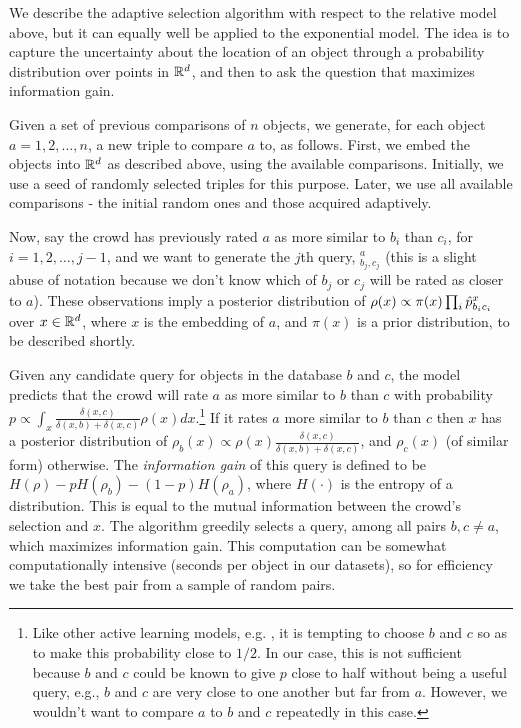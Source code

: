 \documentclass{article}
\begin{document}
We describe the adaptive selection algorithm with respect to the
relative model above, but it can equally well be applied to the
exponential model.  The idea is to capture the uncertainty about the
location of an object through a probability distribution over points
in $\mathbb{R}^d$, and then to ask the question that maximizes information
gain.

Given a set of previous comparisons of $n$ objects, we generate, for
each object $a=1,2,\ldots,n$, a new triple to compare $a$ to, as
follows.  First, we embed the objects into $\mathbb{R}^d$ as described
above, using the available comparisons. Initially, we use a seed of
randomly selected triples for this purpose. Later, we use all
available comparisons - the initial random ones and those acquired
adaptively.

Now, say the crowd has previously rated $a$ as more similar to $b_i$
than $c_i$, for $i=1,2,\ldots,j-1$, and we want to generate the $j$th
query, $^a_{b_j,c_j}$ (this is a slight abuse of notation because we
don't know which of $b_j$ or $c_j$ will be rated as closer to
$a$). These observations imply a posterior distribution of $\rho(x)
\propto \pi(x) \prod_i \hat{p}^{x}_{b_ic_i}$ over $x \in \mathbb{R}^d$, where
$x$ is the embedding of $a$, and $\pi(x)$ is a prior distribution, to
be described shortly.

Given any candidate query for objects in the database $b$ and $c$, the
model predicts that the crowd will rate $a$ as more similar to $b$
than $c$ with probability $p \propto \int_x
\frac{\delta(x,c)}{\delta(x,b)+\delta(x,c)}\rho(x)dx$.\footnote{Like
  other active learning models, e.g. \cite{??}, it is tempting to
  choose $b$ and $c$ so as to make this probability close to $1/2$.
  In our case, this is not sufficient because $b$ and $c$ could be
  known to give $p$ close to half without being a useful query, e.g.,
  $b$ and $c$ are very close to one another but far from $a$.
  However, we wouldn't want to compare $a$ to $b$ and $c$ repeatedly
  in this case.}  If it rates $a$ more similar to $b$ than $c$ then
$x$ has a posterior distribution of $\rho_b(x) \propto
\rho(x)\frac{\delta(x,c)}{\delta(x,b)+\delta(x,c)}$, and $\rho_c(x)$
(of similar form) otherwise.  The {\em information gain} of this query
is defined to be $H(\rho)-pH(\rho_b)-(1-p)H(\rho_a)$, where $H(\cdot)$
is the entropy of a distribution. This is equal to the mutual
information between the crowd's selection and $x$. The algorithm
greedily selects a query, among all pairs $b,c \neq a$, which
maximizes information gain.  This computation can be somewhat
computationally intensive (seconds per object in our datasets), so for
efficiency we take the best pair from a sample of random pairs.
\end{document}
